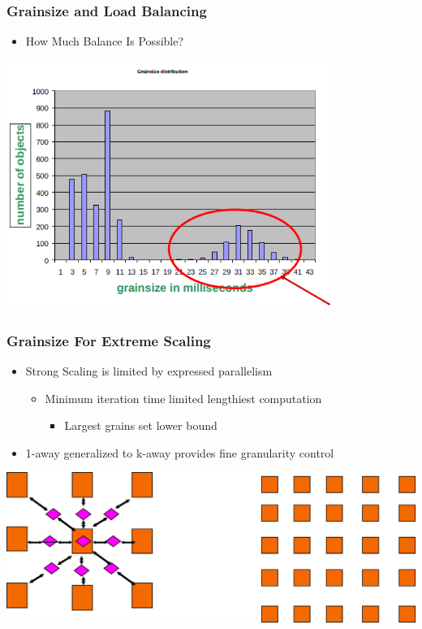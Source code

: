 \begin{frame}[fragile]
\frametitle{Grainsize and Load Balancing}
\begin{itemize}
\item[] How Much Balance Is Possible?
\end{itemize}
\begin{centering}
\includegraphics[width=0.8\textwidth]{figures/histogramGrains}
\end{centering}
\end{frame}

\begin{frame}[fragile]
\frametitle{Grainsize For Extreme Scaling}
\begin{itemize}
 \item Strong Scaling is limited by expressed parallelism
 \begin{itemize}
  \item Minimum iteration time limited lengthiest computation
  \begin {itemize} 
    \item Largest grains set lower bound
  \end{itemize}
 \end{itemize}
 \item 1-away generalized to k-away provides fine granularity control
\end{itemize}
\begin{centering}
\includegraphics[width=1.0\textwidth]{figures/1away2away}
\end{centering}
\end{frame}


